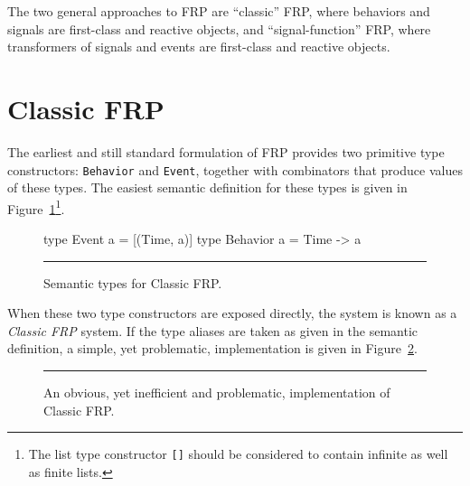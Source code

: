 The two general approaches to FRP are ``classic'' FRP, where behaviors and signals are first-class and reactive objects, and ``signal-function'' FRP,
where transformers of signals and events are first-class and reactive objects.

\section{Classic FRP}
\label{section:Background-Classic_FRP}

The earliest and still standard formulation of FRP provides two primitive type
constructors: {\tt Behavior} and {\tt Event}, together with combinators that
produce values of these types. The easiest semantic definition for these types
is given in Figure~\ref{figure:classic_frp_semantic_types}\footnote{The list type constructor {\tt []} should be considered to contain infinite as well as finite lists.}.

\begin{figure}
\begin{code}
type Event a = [(Time, a)]
type Behavior a = Time -> a
\end{code}
\hrule
\caption{Semantic types for Classic FRP.}
\label{figure:classic_frp_semantic_types}
\end{figure}


When these two type constructors are exposed directly, the system is known as a 
{\em Classic FRP} system. If the type aliases are taken as given in the semantic
definition, a simple, yet problematic, implementation is given in
Figure~\ref{figure:classic_frp_simple_implementation}.

\begin{figure}
\hrule
\caption{An obvious, yet inefficient and problematic, implementation of
Classic FRP.}
\label{figure:classic_frp_simple_implementation}
\end{figure}

